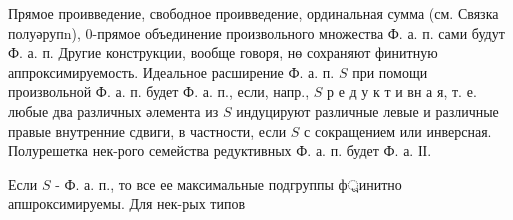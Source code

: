 \documentclass[10pt]{article}
\begin{document}
Прямое проивведение, свободное проивведение, ординальная сумма (см. Связка полуәрупn), 0-прямое объединение произвольного множества Ф. а. п. сами будут Ф. а. п. Другие конструкции, вообще говоря, нө сохраняют финитную аппроксимируемость. Идеальное расширение Ф. а. п. $S$ при помощи произвольной Ф. а. п. будет Ф. а. п., если, напр., $S$ р е д у к т и вн а я, т. е. любые два различных әлемента из $S$ индуцируют различные левые и различные правые внутренние сдвиги, в частности, если $S$ с сокращением или инверсная. Полурешетка нек-рого семейства редуктивных Ф. а. п. будет Ф. а. ІІ.



Если $S$ - Ф. а. п., то все ее максимальные подгруппы ф্রинитно апшроксимируемы. Для нек-рых типов
\end{document}
